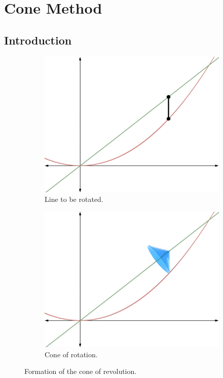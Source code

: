 \documentclass{article}
\begin{document}
\setcounter{secnumdepth}{3}

\section{Cone Method}
\subsection{Introduction}
\begin{figure}[h!]
  \centering
  \begin{subfigure}[b]{0.4\linewidth}
    \includegraphics[width=\linewidth]{Blender/ParabolaLineIntegration-ConeDiagram-f2_0001.png}
    \caption{Line to be rotated.}
    \label{fig:conea}
  \end{subfigure}
  \begin{subfigure}[b]{0.4\linewidth}
    \includegraphics[width=\linewidth]{Blender/ParabolaLineIntegration-ConeGIF-f2_0090.png}
    \caption{Cone of rotation.}
    \label{fig:coneb}
  \end{subfigure}
  \caption{Formation of the cone of revolution.}
  \label{fig:cone}
\end{figure}
\end{document}
